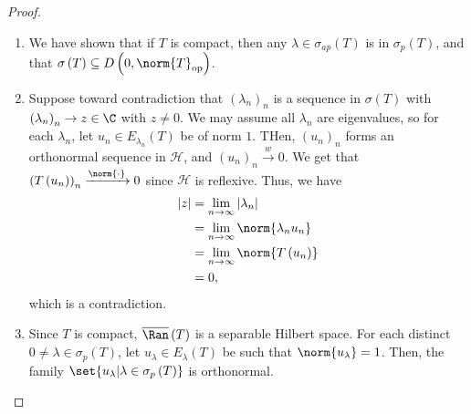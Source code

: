 \documentclass[10pt]{mypackage}
\begin{document}
\begin{proof}\hfill
  \begin{enumerate}[(1)]
    \item We have shown that if $T$ is compact, then any $\lambda\in \sigma_{ap}\left(T\right)$ is in $\sigma_p\left(T\right)$, and that $\sigma\left(T\right)\subseteq D\left(0,\norm{T}_{\text{op}}\right)$.
    \item Suppose toward contradiction that $\left(\lambda_n\right)_n$ is a sequence in $\sigma\left(T\right)$ with $\left(\lambda_n\right)_n\rightarrow z\in \C$ with $z\neq 0$. We may assume all $\lambda_n$ are eigenvalues, so for each $\lambda_n$, let $u_n\in E_{\lambda_n}\left(T\right)$ be of norm $1$. THen, $\left(u_n\right)_n$ forms an orthonormal sequence in $\mathcal{H}$, and $\left(u_n\right)_n\xrightarrow{w}0$. We get that $\left(T\left(u_n\right)\right)_n\xrightarrow{\norm{\cdot}} 0$ since $\mathcal{H}$ is reflexive. Thus, we have
      \begin{align*}
        \left\vert z \right\vert &= \lim_{n\rightarrow\infty} \left\vert \lambda_n \right\vert\\
                                 &= \lim_{n\rightarrow\infty}\norm{\lambda_nu_n}\\
                                 &= \lim_{n\rightarrow\infty}\norm{T\left(u_n\right)}\\
                                 &= 0,
      \end{align*}
      which is a contradiction.
    \item Since $T$ is compact, $\overline{\Ran}\left(T\right)$ is a separable Hilbert space. For each distinct $0\neq \lambda\in \sigma_p\left(T\right)$, let $u_\lambda\in E_\lambda\left(T\right)$ be such that $\norm{u_\lambda}= 1$. Then, the family $\set{u_{\lambda} | \lambda\in \sigma_p\left(T\right)}$ is orthonormal.\newline


\end{enumerate}
\end{proof}
\end{document}
